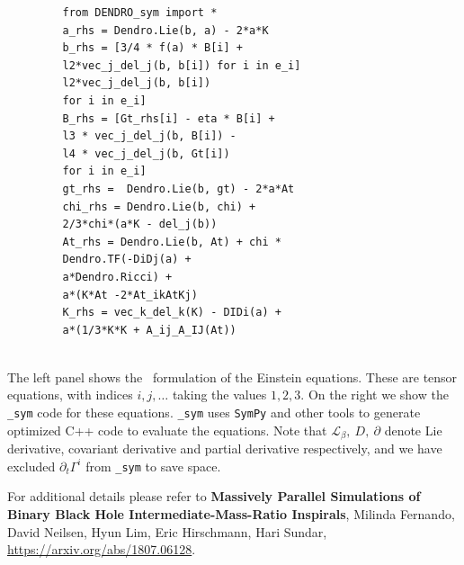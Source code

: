 \documentclass[landscape]{a0poster}
\def\Subhead#1{\noindent{\textbf{\Large\color{DarkBlue} #1}}\medskip}
\begin{document}
\begin{textblock}{14}
\begin{figure}
\begin{minipage}[t]{.5\textwidth}
\begin{verbatim}
   from DENDRO_sym import *
   a_rhs = Dendro.Lie(b, a) - 2*a*K
   b_rhs = [3/4 * f(a) * B[i] + 
   l2*vec_j_del_j(b, b[i]) for i in e_i]
   l2*vec_j_del_j(b, b[i]) 
   for i in e_i]
   B_rhs = [Gt_rhs[i] - eta * B[i] + 
   l3 * vec_j_del_j(b, B[i]) - 
   l4 * vec_j_del_j(b, Gt[i]) 
   for i in e_i]
   gt_rhs =  Dendro.Lie(b, gt) - 2*a*At
   chi_rhs = Dendro.Lie(b, chi) + 
   2/3*chi*(a*K - del_j(b)) 
   At_rhs = Dendro.Lie(b, At) + chi *
   Dendro.TF(-DiDj(a) + 
   a*Dendro.Ricci) +
   a*(K*At -2*At_ikAtKj)
   K_rhs = vec_k_del_k(K) - DIDi(a) +
   a*(1/3*K*K + A_ij_A_IJ(At)) 
   
\end{verbatim}
\end{minipage}
\vspace{-0.15in}
\end{figure}
The left panel shows the \BSSN ~formulation of the Einstein equations. These are tensor equations, with indices $i,j,\ldots$ taking the values $1, 2, 3$. On the right we show the \texttt{{\dendro\_sym}} code for these equations. \texttt{\dendro\_sym} uses \texttt{SymPy} and other tools to generate optimized C++ code to evaluate the equations. Note that $\mathcal{L}_\beta,\ D,\ \partial$ denote Lie derivative, covariant derivative and partial derivative respectively, and we have excluded $\partial_t\Gamma^i$ from \texttt{\dendro\_sym} to save space.

For additional details please refer to {\bf Massively Parallel Simulations of Binary Black Hole Intermediate-Mass-Ratio Inspirals}, Milinda Fernando, David Neilsen, Hyun Lim, Eric Hirschmann, Hari Sundar, \url{https://arxiv.org/abs/1807.06128}.
\end{textblock}





	
\end{document}
